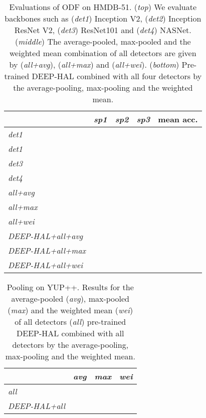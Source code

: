 \begin{table}[t]\vspace{-0.3cm}
\parbox{.99\linewidth}{
\setlength{\tabcolsep}{0.12em}
\renewcommand{\arraystretch}{0.70}
\centering
\begin{tabular}{ l c c c c }
\toprule
 & {\em sp1} & {\em sp2} & {\em sp3} & mean acc. \\
\hline
{\em det1} &  &  &  & \\
{\em det1} &  &  &  & \\
{\em det3} &  &  &  & \\
{\em det4} &  &  &  & \\
\hdashline
{\em all+avg} &  &  &  & \\
{\em all+max} &  &  &  & \\
{\em all+wei} &  &  &  & \\
\hdashline
{\em DEEP-HAL+all+avg} &  &  &  & \\
{\em DEEP-HAL+all+max} &  &  &  & \\
{\em DEEP-HAL+all+wei} &  &  &  & \\
\bottomrule
\end{tabular}
}
\caption{Evaluations of ODF on HMDB-51. ({\em top}) We evaluate backbones such as ({\em det1}) Inception V2, ({\em det2}) Inception ResNet V2, ({\em det3}) ResNet101 and ({\em det4}) NASNet. ({\em middle}) The average-pooled, max-pooled and the weighted mean combination of all detectors are given by ({\em all+avg}), ({\em all+max}) and ({\em all+wei}). ({\em bottom}) Pre-trained DEEP-HAL combined with all four detectors by the average-pooling, max-pooling and the weighted mean.
}
\vspace{-0.3cm}
\label{tab:det1234}
\end{table}
\begin{table}[t]\vspace{-0.3cm}
\parbox{.99\linewidth}{
\setlength{\tabcolsep}{0.12em}
\renewcommand{\arraystretch}{0.70}
\centering
\begin{tabular}{ l c c c }
\toprule
 & {\em avg} & {\em max} & {\em wei}  \\
\hline
{\em all}          &  &  &  \\
{\em DEEP-HAL+all} &  &  &  \\
\bottomrule
\end{tabular}
}
\caption{Pooling on YUP++. Results for the average-pooled ({\em avg}), max-pooled ({\em max}) and the weighted mean  ({\em wei}) of all detectors ({\em all}) \vs pre-trained DEEP-HAL combined with all detectors by the average-pooling, max-pooling and the weighted mean.
}
\vspace{-0.5cm}
\label{tab:yup-pool}
\end{table}


